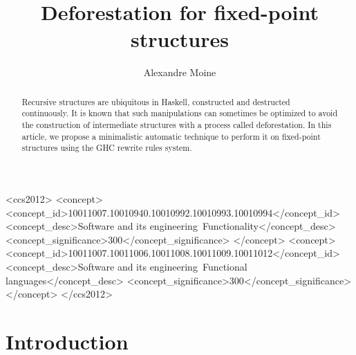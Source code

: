 \documentclass[format=sigplan, review=true, anonymous=true]{acmart}
\begin{document}
\title{Deforestation for fixed-point structures}
\author{Alexandre Moine}


\begin{abstract}
Recursive structures are ubiquitous in Haskell, constructed and destructed continuously. It is known that such manipulations can sometimes be optimized to avoid the construction of intermediate structures with a process called deforestation. In this article, we propose a minimalistic automatic technique to perform it on fixed-point structures using the GHC rewrite rules system.
\end{abstract}

%

\begin{CCSXML}
	<ccs2012>
	<concept>
	<concept_id>10011007.10010940.10010992.10010993.10010994</concept_id>
	<concept_desc>Software and its engineering~Functionality</concept_desc>
	<concept_significance>300</concept_significance>
	</concept>
	<concept>
	<concept_id>10011007.10011006.10011008.10011009.10011012</concept_id>
	<concept_desc>Software and its engineering~Functional languages</concept_desc>
	<concept_significance>300</concept_significance>
	</concept>
	</ccs2012>
\end{CCSXML}



%


%
\maketitle

\section{Introduction}
\end{document}
